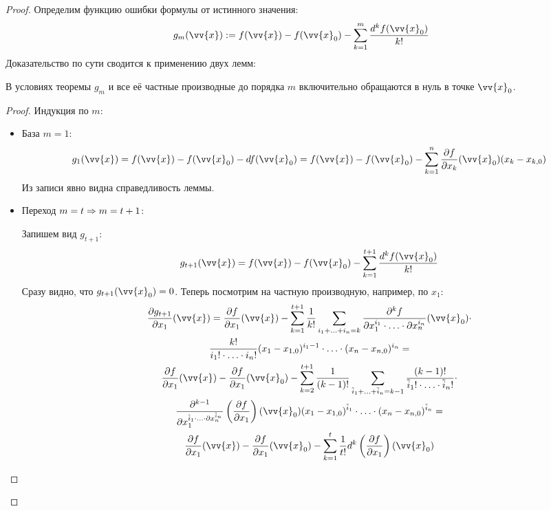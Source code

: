 \begin{proof}
	Определим функцию ошибки формулы от истинного значения:
	\[
		g_m(\vv{x}) := f(\vv{x}) - f(\vv{x}_0) - \suml_{k = 1}^m \frac{d^k f(\vv{x}_0)}{k!}
	\]
	Доказательство по сути сводится к применению двух лемм:
	\begin{lemma}
		В условиях теоремы $g_m$ и все её частные производные до порядка $m$ включительно обращаются в нуль в точке $\vv{x}_0$.
	\end{lemma}

	\begin{proof}
		Индукция по $m$:
		\begin{itemize}
			\item База $m = 1$:
			\[
				g_1(\vv{x}) = f(\vv{x}) - f(\vv{x}_0) - d f(\vv{x}_0) = f(\vv{x}) - f(\vv{x}_0) - \suml_{k = 1}^n \pd{f}{x_k} (\vv{x}_0) (x_k - x_{k, 0})
			\]
			Из записи явно видна справедливость леммы.
			
			\item Переход $m = t \Rightarrow m = t + 1$:
			
			Запишем вид $g_{t + 1}$:
			\[
				g_{t + 1}(\vv{x}) = f(\vv{x}) - f(\vv{x}_0) - \suml_{k = 1}^{t + 1} \frac{d^k f(\vv{x}_0)}{k!}
			\]
			Сразу видно, что $g_{t + 1} (\vv{x}_0) = 0$. Теперь посмотрим на частную производную, например, по $x_1$:
			\begin{multline*}
				\pd{g_{t + 1}}{x_1} (\vv{x}) = \pd{f}{x_1} (\vv{x}) - \suml_{k = 1}^{t + 1} \frac{1}{k!} \suml_{i_1 + \ldots + i_n = k} \frac{\vdelta^k f}{\vdelta x_1^{i_1} \cdot \ldots \cdot \vdelta x_n^{i_n}} (\vv{x}_0) \cdot
				\\
				\frac{k!}{i_1! \cdot \ldots \cdot i_n!} (x_1 - x_{1, 0})^{i_1 - 1} \cdot \ldots \cdot (x_n - x_{n, 0})^{i_n} =
				\\
				\pd{f}{x_1} (\vv{x}) - \pd{f}{x_1} (\vv{x}_0) - \suml_{k = 2}^{t + 1} \frac{1}{(k - 1)!} \suml_{\tilde{i}_1 + \ldots + \tilde{i}_n = k - 1} \frac{(k - 1)!}{\tilde{i}_1! \cdot \ldots \cdot \tilde{i}_n!} \cdot
				\\
				\frac{\vdelta^{k - 1}}{\vdelta x_1^{\tilde{i}_1 \cdot \ldots \cdot \vdelta x_n^{\tilde{i}_n}}} \left(\pd{f}{x_1}\right) (\vv{x}_0) (x_1 - x_{1, 0})^{\tilde{i}_1} \cdot \ldots \cdot (x_n - x_{n, 0})^{\tilde{i}_n} =
				\\
				\pd{f}{x_1} (\vv{x}) - \pd{f}{x_1} (\vv{x}_0) - \suml_{k = 1}^t \frac{1}{t!} d^k \left(\pd{f}{x_1}\right) (\vv{x}_0)
			\end{multline*}
		\end{itemize}
	

\end{proof}
\end{proof}
